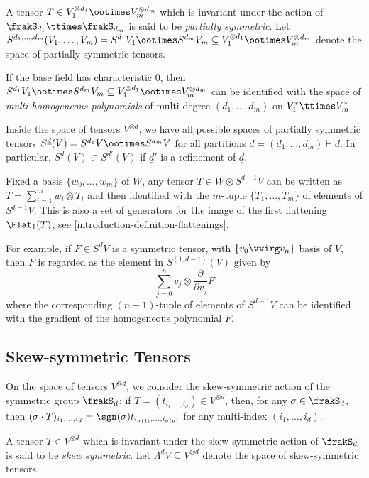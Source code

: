 \begin{definition}
\label{introduction-definition-partially_symmetric_tensors}    
A tensor $T \in V_1^{\otimes d_1}\ootimes V_m^{\otimes d_m}$ which is invariant under the action of $\frakS_{d_1} \ttimes \frakS_{d_m}$ is said to be \emph{partially symmetric}. Let $S^{d_1,\ldots,d_m}(V_1,\ldots,V_m) = S^{d_1} V_1 \ootimes S^{d_m}V_m \subseteq V_1^{\otimes d_1}\ootimes V_m^{\otimes d_m}$ denote the space of partially symmetric tensors. 

If the base field has characteristic $0$, then $S^{d_1} V_1 \ootimes S^{d_m}V_m \subseteq V_1^{\otimes d_1}\ootimes V_m^{\otimes d_m}$ can be identified with the space of \emph{multi-homogeneous polynomials} of multi-degree $(d_1,\ldots,d_m)$ on $V^*_1 \ttimes V^*_m$. 
\end{definition}

Inside the space of tensors $V^{\otimes d}$, we have all possible spaces of partially symmetric tensors $S^{\underline{d}}(V) = S^{d_1} V \ootimes S^{d_m}V$ for all partitions $\underline{d} = (d_1,\ldots,d_m)\vdash d$. In particular, $S^{\underline{d}}(V) \subset S^{\underline{d'}}(V)$ if $\underline{d}'$ is a refinement of $\underline{d}$.

Fixed a basis $\{w_0,\ldots,w_m\}$ of $W$, any tensor $T \in W \otimes S^{d-1} V$ can be written as $T = \sum_{i=1}^m w_i \otimes T_i$ and then identified with the $m$-tuple $\{T_1,\ldots,T_m\}$ of elements of $S^{d-1} V$. This is also a set of generators for the image of the first flattening $\Flat_1(T)$, see \ref{introduction-definition-flattenings}.

For example, if $F \in S^d V$ is a symmetric tensor, with $\{v_0 \vvirg v_n\}$ basis of $V$, then $F$ is regarded as the element in $S^{(1,d-1)}(V)$ given by 
\[
    \sum_{j=0}^n v_j \otimes \textstyle\frac{\partial }{\partial v_j} F
\]
where the corresponding $(n+1)$-tuple of elements of $S^{d-1} V$ can be identified with the gradient of the homogeneous polynomial $F$.

\subsection{Skew-symmetric Tensors}
\label{introduction-subsection-skew_symmetric_tensors}
On the space of tensors $V^{\otimes d}$, we consider the skew-symmetric action of the symmetric group $\frakS_d$: if $T = (t_{i_1,\ldots,i_d}) \in V^{\otimes d}$, then, for any $\sigma \in \frakS_d$, then $(\sigma \cdot T)_{i_1,\ldots,i_d} = \sgn(\sigma)t_{i_{\sigma(1)},\ldots,i_{\sigma(d)}}$ for any multi-index $(i_1,\ldots,i_d)$.
\begin{definition}
\label{introduction-definition-skew_symmetric_tensors}
A tensor $T \in V^{\otimes d}$ which is invariant under the skew-symmetric action of $\frakS_d$ is said to be \emph{skew symmetric}. Let $\Lambda^d V \subseteq V^{\otimes d}$ denote the space of skew-symmetric tensors. 
\end{definition}

